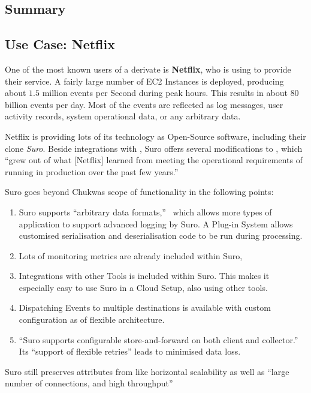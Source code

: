 \subsection{Summary}

\subsection{Use Case: Netflix}
One of the most known users of a \chuk derivate is \textbf{Netflix}, who is using \aws to provide their service. A fairly large number of \aws EC2 Instances is deployed, producing about $1.5$ million events per Second during peak hours. This results in about $80$ billion events per day. Most of the events are reflected as log messages, user activity records, system operational data, or any arbitrary data.~\cite{Bae2013}

Netflix is providing lots of its technology as Open-Source software, including their \chuk clone \textit{Suro}. 
Beside integrations with \noss, Suro offers several modifications to \chuk, which ``grew out of what [Netflix] learned from meeting the operational requirements of running in production over the past few years.''~\cite{Bae2013}

Suro goes beyond Chukwas scope of functionality in the following points:
\begin{enumerate}
  \item Suro supports ``arbitrary data formats,''~\cite{Bae2013} which allows more types of application to support advanced logging by Suro. A Plug-in System allows customised serialisation and deserialisation code to be run during processing.
  \item Lots of monitoring metrics are already included within Suro, 
  \item Integrations with other \noss Tools is included within Suro. This makes it especially easy to use Suro in a Cloud Setup, also using other \noss tools.~\cite{GithubNetflixSuro}
  \item \label{itm:SutoMultiDest} Dispatching Events to multiple destinations is available with custom configuration as of flexible architecture.~\cite{Bae2013, GithubNetflixSuro} 
  \item ``Suro supports configurable store-and-forward on both client and collector.''~\cite{Bae2013} Its ``support of flexible retries'' leads to minimised data loss.~\cite{GithubNetflixSuro}
\end{enumerate}
Suro still preserves attributes from \chuk like horizontal scalability as well as ``large number of connections, and high throughput''~\cite{GithubNetflixSuro}

